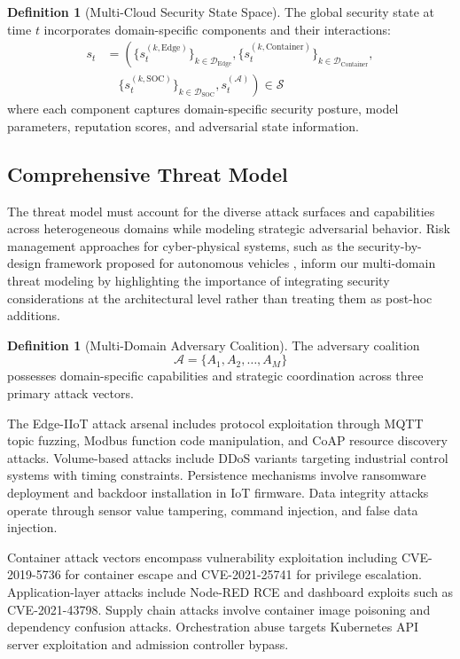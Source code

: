 \documentclass[12pt,a4paper]{article}
\newcommand{\rev}[1]{\textcolor{revcolor}{#1}}
\theoremstyle{definition}
\newtheorem{definition}[theorem]{Definition}
\newcommand{\A}{\mathcal{A}}
\begin{document}
\begin{definition}[Multi-Cloud Security State Space]
\label{def:state_space}
The global security state at time $t$ incorporates domain-specific components and their interactions:
\begin{align}
s_t &= \left(\{s_t^{(k,\text{Edge})}\}_{k \in \mathcal{D}_{\text{Edge}}}, \{s_t^{(k,\text{Container})}\}_{k \in \mathcal{D}_{\text{Container}}}, \right. \nonumber\\
&\quad \left. \{s_t^{(k,\text{SOC})}\}_{k \in \mathcal{D}_{\text{SOC}}}, s_t^{(\mathcal{A})}\right) \in \mathcal{S}
\end{align}
where each component captures domain-specific security posture, model parameters, reputation scores, and adversarial state information.
\end{definition}

\subsection{Comprehensive Threat Model}

The threat model must account for the diverse attack surfaces and capabilities across heterogeneous domains while modeling strategic adversarial behavior. \rev{Risk management approaches for cyber-physical systems, such as the security-by-design framework proposed for autonomous vehicles \cite{abdelbasset2021security}, inform our multi-domain threat modeling by highlighting the importance of integrating security considerations at the architectural level rather than treating them as post-hoc additions.}

\begin{definition}[Multi-Domain Adversary Coalition]
\label{def:adversary_coalition}
The adversary coalition
\[
\A = \{A_1, A_2, \ldots, A_M\}
\]
possesses domain-specific capabilities and strategic coordination across three primary attack vectors.
\end{definition}

The Edge-IIoT attack arsenal includes protocol exploitation through MQTT topic fuzzing, Modbus function code manipulation, and CoAP resource discovery attacks. Volume-based attacks include DDoS variants targeting industrial control systems with timing constraints. Persistence mechanisms involve ransomware deployment and backdoor installation in IoT firmware. Data integrity attacks operate through sensor value tampering, command injection, and false data injection.

Container attack vectors encompass vulnerability exploitation including CVE-2019-5736 for container escape and CVE-2021-25741 for privilege escalation. Application-layer attacks include Node-RED RCE and dashboard exploits such as CVE-2021-43798. Supply chain attacks involve container image poisoning and dependency confusion attacks. Orchestration abuse targets Kubernetes API server exploitation and admission controller bypass.
\end{document}
